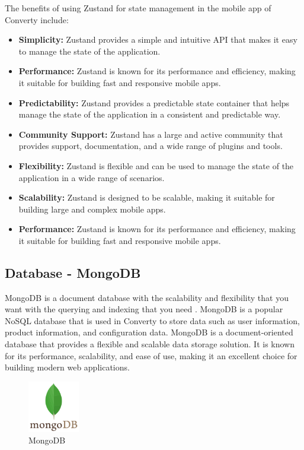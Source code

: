 The benefits of using Zustand for state management in the mobile app of Converty include:

\begin{itemize}
    \item \textbf{Simplicity:} Zustand provides a simple and intuitive API that makes it easy to manage the state of the application.
    \item \textbf{Performance:} Zustand is known for its performance and efficiency, making it suitable for building fast and responsive mobile apps.
    \item \textbf{Predictability:} Zustand provides a predictable state container that helps manage the state of the application in a consistent and predictable way.
    \item \textbf{Community Support:} Zustand has a large and active community that provides support, documentation, and a wide range of plugins and tools.
    \item \textbf{Flexibility:} Zustand is flexible and can be used to manage the state of the application in a wide range of scenarios.
    \item \textbf{Scalability:} Zustand is designed to be scalable, making it suitable for building large and complex mobile apps.
    \item \textbf{Performance:} Zustand is known for its performance and efficiency, making it suitable for building fast and responsive mobile apps.
\end{itemize}

\subsection{Database - MongoDB}
MongoDB is a document database with the scalability and flexibility that you want with the querying and indexing that you need \cite{mongodb}. MongoDB is a popular NoSQL database that is used in Converty to store data such as user information, product information, and configuration data. MongoDB is a document-oriented database that provides a flexible and scalable data storage solution. It is known for its performance, scalability, and ease of use, making it an excellent choice for building modern web applications.

\begin{figure}[H]
    \centering
    \includegraphics[width=0.2\textwidth]{Images/mongodb2.png}
    \caption{MongoDB}
    \label{fig:mongodb}
\end{figure}

